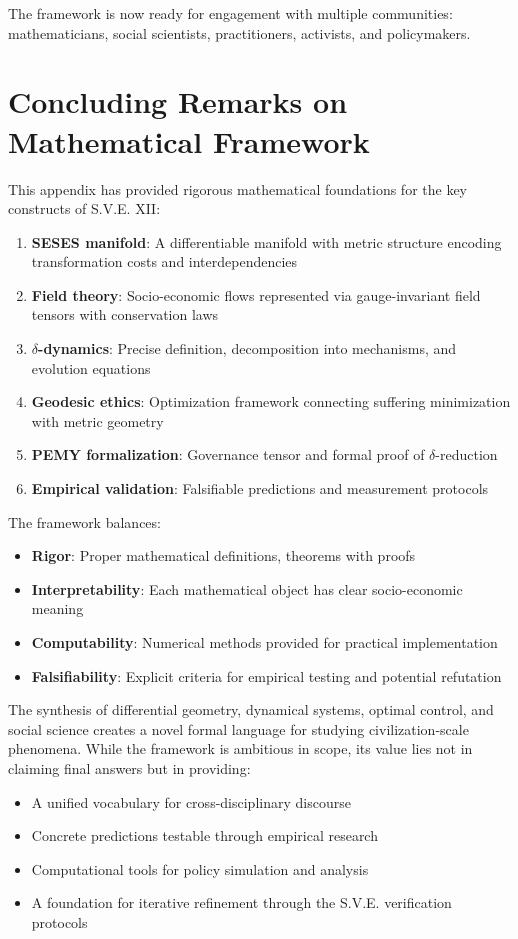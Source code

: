 \documentclass[11pt,a4paper]{article}
\theoremstyle{definition}
\theoremstyle{remark}
\begin{document}
The framework is now ready for engagement with multiple communities: mathematicians, social scientists, practitioners, activists, and policymakers.

\section{Concluding Remarks on Mathematical Framework}
\label{app:conclusion}

This appendix has provided rigorous mathematical foundations for the key constructs of S.V.E. XII:
\begin{enumerate}[leftmargin=1.5em]
    \item \textbf{SESES manifold}: A differentiable manifold with metric structure encoding transformation costs and interdependencies
    \item \textbf{Field theory}: Socio-economic flows represented via gauge-invariant field tensors with conservation laws
    \item \textbf{$\delta$-dynamics}: Precise definition, decomposition into mechanisms, and evolution equations
    \item \textbf{Geodesic ethics}: Optimization framework connecting suffering minimization with metric geometry
    \item \textbf{PEMY formalization}: Governance tensor and formal proof of $\delta$-reduction
    \item \textbf{Empirical validation}: Falsifiable predictions and measurement protocols
\end{enumerate}

The framework balances:
\begin{itemize}[leftmargin=1.5em]
    \item \textbf{Rigor}: Proper mathematical definitions, theorems with proofs
    \item \textbf{Interpretability}: Each mathematical object has clear socio-economic meaning
    \item \textbf{Computability}: Numerical methods provided for practical implementation
    \item \textbf{Falsifiability}: Explicit criteria for empirical testing and potential refutation
\end{itemize}

The synthesis of differential geometry, dynamical systems, optimal control, and social science creates a novel formal language for studying civilization-scale phenomena. While the framework is ambitious in scope, its value lies not in claiming final answers but in providing:
\begin{itemize}[leftmargin=1.5em]
    \item A unified vocabulary for cross-disciplinary discourse
    \item Concrete predictions testable through empirical research
    \item Computational tools for policy simulation and analysis
    \item A foundation for iterative refinement through the S.V.E. verification protocols
\end{itemize}
\end{document}

